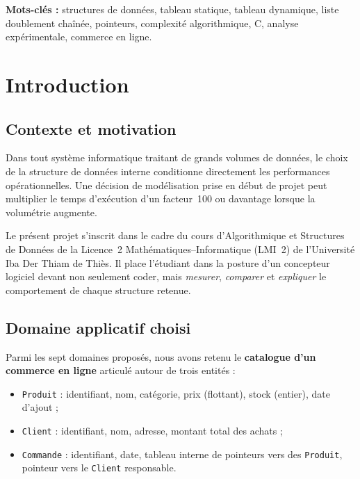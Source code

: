 \documentclass[12pt,a4paper]{report}
\begin{document}
\vspace{0.5cm}
\noindent\textbf{Mots-clés :} structures de données, tableau statique, tableau dynamique, liste doublement chaînée, pointeurs, complexité algorithmique, C, analyse expérimentale, commerce en ligne.

\tableofcontents
\clearpage

\listoffigures
\listoftables
\clearpage
{}

\chapter{Introduction}

\section{Contexte et motivation}

Dans tout système informatique traitant de grands volumes de données, le choix de la structure de données interne conditionne directement les performances opérationnelles. Une décision de modélisation prise en début de projet peut multiplier le temps d'exécution d'un facteur~100 ou davantage lorsque la volumétrie augmente.

Le présent projet s'inscrit dans le cadre du cours d'Algorithmique et Structures de Données de la Licence~2 Mathématiques--Informatique (LMI~2) de l'Université Iba Der Thiam de Thiès. Il place l'étudiant dans la posture d'un concepteur logiciel devant non seulement coder, mais \emph{mesurer}, \emph{comparer} et \emph{expliquer} le comportement de chaque structure retenue.

\section{Domaine applicatif choisi}

Parmi les sept domaines proposés, nous avons retenu le \textbf{catalogue d'un commerce en ligne} articulé autour de trois entités :
\begin{itemize}
    \item \texttt{Produit} : identifiant, nom, catégorie, prix (flottant), stock (entier), date d'ajout ;
    \item \texttt{Client} : identifiant, nom, adresse, montant total des achats ;
    \item \texttt{Commande} : identifiant, date, tableau interne de pointeurs vers des \texttt{Produit}, pointeur vers le \texttt{Client} responsable.
\end{itemize}
\end{document}
